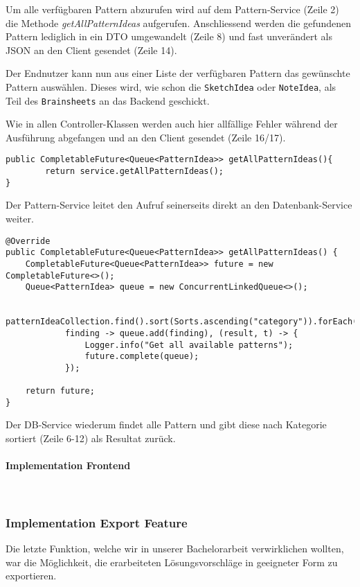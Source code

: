 Um alle verfügbaren Pattern abzurufen wird auf dem Pattern-Service (Zeile 2) die Methode \textit{getAllPatternIdeas} aufgerufen. Anschliessend werden die gefundenen Pattern lediglich in ein DTO umgewandelt (Zeile 8) und fast unverändert als JSON an den Client gesendet (Zeile 14).

Der Endnutzer kann nun aus einer Liste der verfügbaren Pattern das gewünschte Pattern auswählen. Dieses wird, wie schon die \texttt{SketchIdea} oder \texttt{NoteIdea}, als Teil des \texttt{Brainsheets} an das Backend geschickt. 

Wie in allen Controller-Klassen werden auch hier allfällige Fehler während der Ausführung abgefangen und an den Client gesendet (Zeile 16/17).

\begin{lstlisting}[caption={Alle Pattern holen im Pattern Service}, label=getAllPatternInService]
public CompletableFuture<Queue<PatternIdea>> getAllPatternIdeas(){
        return service.getAllPatternIdeas();
}
\end{lstlisting}

Der Pattern-Service leitet den Aufruf seinerseits direkt an den Datenbank-Service weiter.

\begin{lstlisting}[caption={Alle Pattern holen im Pattern DB Service}, label=getAllPatternInDBService]
@Override
public CompletableFuture<Queue<PatternIdea>> getAllPatternIdeas() {
    CompletableFuture<Queue<PatternIdea>> future = new CompletableFuture<>();
    Queue<PatternIdea> queue = new ConcurrentLinkedQueue<>();

    patternIdeaCollection.find().sort(Sorts.ascending("category")).forEach(
            finding -> queue.add(finding), (result, t) -> {
                Logger.info("Get all available patterns");
                future.complete(queue);
            });

    return future;
}
\end{lstlisting}

Der DB-Service wiederum findet alle Pattern und gibt diese nach Kategorie sortiert (Zeile 6-12) als Resultat zurück.

\paragraph*{Implementation Frontend}~\\

\subsubsection{Implementation Export Feature}
Die letzte Funktion, welche wir in unserer Bachelorarbeit verwirklichen wollten, war die Möglichkeit, die erarbeiteten Lösungsvorschläge in geeigneter Form zu exportieren.


